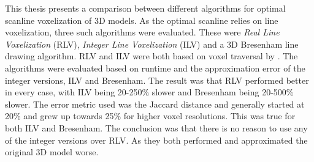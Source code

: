 This thesis presents a comparison between different algorithms for optimal scanline voxelization of 3D models.
As the optimal scanline relies on line voxelization, three such algorithms were evaluated.
These were \textit{Real Line Voxelization} (RLV), \textit{Integer Line Voxelization} (ILV) and a 3D Bresenham line drawing algorithm.
RLV and ILV were both based on voxel traversal by \citeauthor{voxeltraversal}.
The algorithms were evaluated based on runtime and the approximation error of the integer versions, ILV and Bresenham.
The result was that RLV performed better in every case, with ILV being 20-250\% slower and Bresenham being 20-500\% slower.
The error metric used was the Jaccard distance and generally started at 20\% and grew up towards 25\% for higher voxel resolutions.
This was true for both ILV and Bresenham.
The conclusion was that there is no reason to use any of the integer versions over RLV.
As they both performed and approximated the original 3D model worse.
